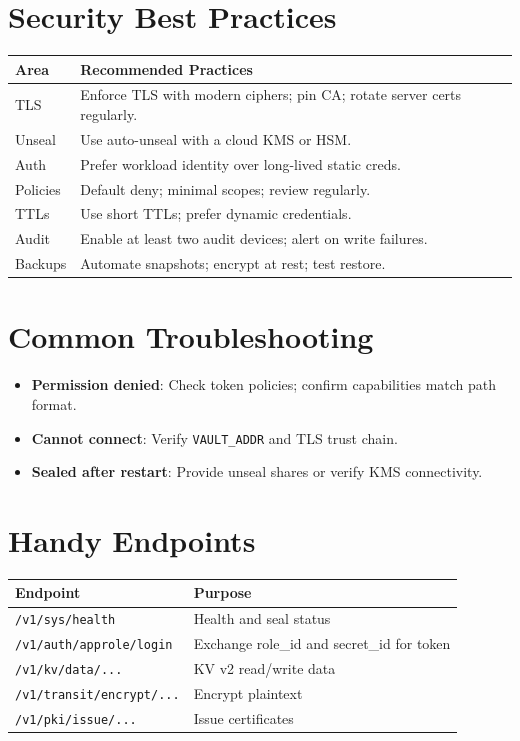\documentclass[11pt]{article}
\begin{document}
\section{Security Best Practices}

\begin{tabularx}{\textwidth}{@{} p{2.5cm} X @{}}
\toprule
\textbf{Area} & \textbf{Recommended Practices} \\
\midrule
TLS & Enforce TLS with modern ciphers; pin CA; rotate server certs regularly. \\
Unseal & Use auto-unseal with a cloud KMS or HSM. \\
Auth & Prefer workload identity over long-lived static creds. \\
Policies & Default deny; minimal scopes; review regularly. \\
TTLs & Use short TTLs; prefer dynamic credentials. \\
Audit & Enable at least two audit devices; alert on write failures. \\
Backups & Automate snapshots; encrypt at rest; test restore. \\
\bottomrule
\end{tabularx}

\section{Common Troubleshooting}

\begin{itemize}
  \item \textbf{Permission denied}: Check token policies; confirm capabilities match path format.
  \item \textbf{Cannot connect}: Verify \texttt{VAULT\_ADDR} and TLS trust chain.
  \item \textbf{Sealed after restart}: Provide unseal shares or verify KMS connectivity.
\end{itemize}

\section{Handy Endpoints}

\begin{tabularx}{\textwidth}{@{} p{5cm} X @{}}
\toprule
\textbf{Endpoint} & \textbf{Purpose} \\
\midrule
\texttt{/v1/sys/health} & Health and seal status \\
\texttt{/v1/auth/approle/login} & Exchange role\_id and secret\_id for token \\
\texttt{/v1/kv/data/...} & KV v2 read/write data \\
\texttt{/v1/transit/encrypt/...} & Encrypt plaintext \\
\texttt{/v1/pki/issue/...} & Issue certificates \\
\bottomrule
\end{tabularx}
\end{document}
